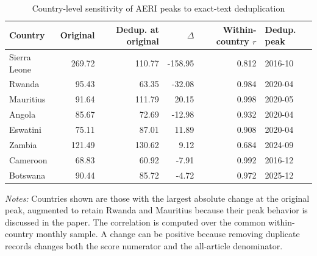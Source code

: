 \begin{table}[htbp]\centering\scriptsize\setlength{\tabcolsep}{4pt}
\caption{Country-level sensitivity of AERI peaks to exact-text deduplication}\label{tab:supp_dedup_country}
\begin{tabular}{lrrrrl}\toprule
Country & Original & Dedup. at original & $\Delta$ & Within-country $r$ & Dedup. peak\\\midrule
Sierra Leone & 269.72 & 110.77 & -158.95 & 0.812 & 2016-10\\
Rwanda & 95.43 & 63.35 & -32.08 & 0.984 & 2020-04\\
Mauritius & 91.64 & 111.79 & 20.15 & 0.998 & 2020-05\\
Angola & 85.67 & 72.69 & -12.98 & 0.932 & 2020-04\\
Eswatini & 75.11 & 87.01 & 11.89 & 0.908 & 2020-04\\
Zambia & 121.49 & 130.62 & 9.12 & 0.684 & 2024-09\\
Cameroon & 68.83 & 60.92 & -7.91 & 0.992 & 2016-12\\
Botswana & 90.44 & 85.72 & -4.72 & 0.972 & 2025-12\\
\bottomrule\end{tabular}
\begin{singlespace}\footnotesize\textit{Notes:} Countries shown are those with the largest absolute change at the original peak, augmented to retain Rwanda and Mauritius because their peak behavior is discussed in the paper. The correlation is computed over the common within-country monthly sample. A change can be positive because removing duplicate records changes both the score numerator and the all-article denominator.\end{singlespace}
\end{table}